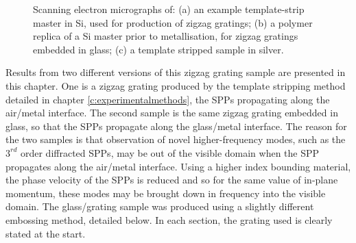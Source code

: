 \begin{figure}
\begin{center}
\end{center}
\caption[Scanning electron micrographs of various zigzag grating samples.]{Scanning electron micrographs of: (a) an example template-strip master in Si, used for production of zigzag gratings; (b) a polymer replica of a Si master prior to metallisation, for zigzag gratings embedded in glass; (c) a template stripped sample in silver.}
\end{figure}

Results from two different versions of this zigzag grating sample are presented in this chapter. One is a zigzag grating produced by the template stripping method detailed in chapter \ref{c:experimentalmethods}, the SPPs propagating along the air/metal interface. The second sample is the same zigzag grating embedded in glass, so that the SPPs propagate along the glass/metal interface. The reason for the two samples is that observation of novel higher-frequency modes, such as the $3^{rd}$ order diffracted SPPs, may be out of the visible domain when the SPP propagates along the air/metal interface. Using a higher index bounding material, the phase velocity of the SPPs is reduced and so for the same value of in-plane momentum, these modes may be brought down in frequency into the visible domain. The glass/grating sample was produced using a slightly different embossing method, detailed below. In each section, the grating used is clearly stated at the start.


